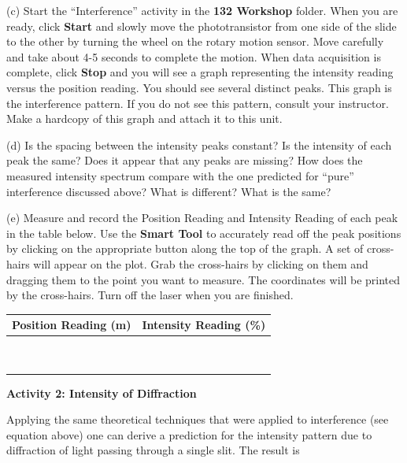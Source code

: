\pagebreak
(c) Start the ``Interference'' activity in the {\bf 132 Workshop} folder. 
When you are ready, click {\bf Start} and slowly move the phototransistor from one side of the slide to the other by turning the wheel on the rotary motion sensor. Move carefully and take about 4-5 seconds to complete the motion. When data acquisition is complete, click {\bf Stop} and you will see a graph
representing the intensity reading versus the position reading. You
should see several distinct peaks. This graph is the interference
pattern. If you do not see this pattern, consult your instructor.
Make a hardcopy of this graph and attach it to this unit.

(d) Is the spacing between the intensity peaks constant? Is the intensity
of each peak the same? Does it appear that any peaks are missing?
How does the measured intensity spectrum compare with the one predicted
for {}``pure'' interference discussed above? What is different?
What is the same?
\answerspace{30mm}

(e) Measure and record the Position Reading and Intensity Reading
of each peak in the table below.
Use the
{\bf Smart Tool} to accurately read off the peak positions by clicking on the
appropriate button along the top of the graph. A set of cross-hairs will appear on the
plot. Grab the cross-hairs by clicking on them and dragging them to the point you want
to measure.
The coordinates will be printed by the cross-hairs.
Turn off the laser when you are finished.

\vspace{0.3cm}
{\centering \begin{tabular}{|c|c|}
\hline 
Position Reading (m)&
Intensity Reading (\%)\\
\hline
\hline 
&
\\
\hline 
&
\\
\hline 
&
\\
\hline 
&
\\
\hline 
&
\\
\hline 
&
\\
\hline 
&
\\
\hline 
&
\\
\hline 
&
\\
\hline
\end{tabular}\par}
\vspace{0.3cm}

\textbf{Activity 2: Intensity of Diffraction} 

Applying the same theoretical techniques that were applied to interference
(see equation above) one can derive a prediction for the intensity
pattern due to diffraction of light passing through a single slit.
The result is 

